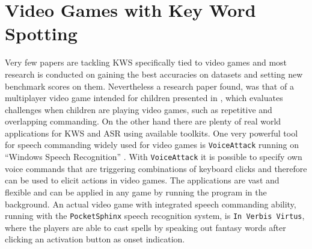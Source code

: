 
\section{Video Games with Key Word Spotting}\label{sec:prev_kws_games}
Very few papers are tackling KWS specifically tied to video games and most research is conducted on gaining the best accuracies on datasets and setting new benchmark scores on them.
Nevertheless a research paper found, was that of a multiplayer video game intended for children presented in \cite{Harshavardhan2015}, which evaluates challenges when children are playing video games, such as repetitive and overlapping commanding.
On the other hand there are plenty of real world applications for KWS and ASR using available toolkits.
One very powerful tool for speech commanding widely used for video games is \texttt{VoiceAttack} running on \enquote{Windows Speech Recognition} \cite{Xiong2017}.
With \texttt{VoiceAttack} it is possible to specify own voice commands that are triggering combinations of keyboard clicks and therefore can be used to elicit actions in video games.
The applications are vast and flexible and can be applied in any game by running the program in the background.
An actual video game with integrated speech commanding ability, running with the \texttt{PocketSphinx} \cite{Huggins2006} speech recognition system, is \texttt{In Verbis Virtus}, where the players are able to cast spells by speaking out fantasy words after clicking an activation button as onset indication.